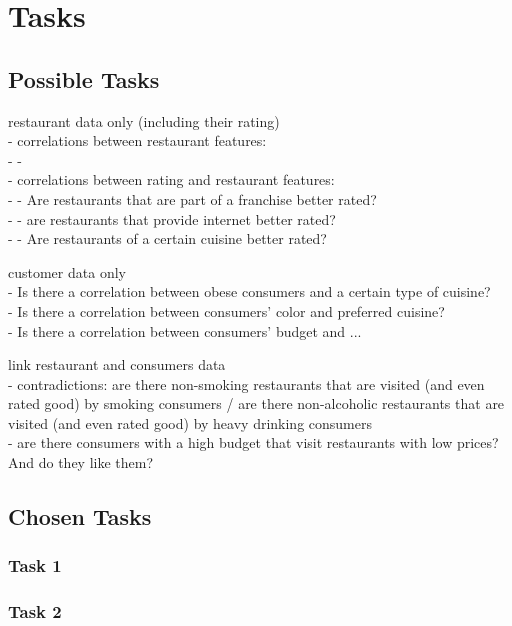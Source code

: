 \section{Tasks}\label{sec:tasks}


\subsection{Possible Tasks}

restaurant data only (including their rating)
\\- correlations between restaurant features:
\\- - 
\\- correlations between rating and restaurant features:
\\- - Are restaurants that are part of a franchise better rated?
\\- - are restaurants that provide internet better rated?
\\- - Are restaurants of a certain cuisine better rated?


customer data only
\\- Is there a correlation between obese consumers and a certain type of cuisine?
\\- Is there a correlation between consumers' color and preferred cuisine?
\\- Is there a correlation between consumers' budget and ...


link restaurant and consumers data
\\- contradictions: are there non-smoking restaurants that are visited (and even rated good) by smoking consumers / are there non-alcoholic restaurants that are visited (and even rated good) by heavy drinking consumers
\\- are there consumers with a high budget that visit restaurants with low prices? And do they like them?
\\


\subsection{Chosen Tasks}



\subsubsection{Task 1}\label{sec:task1}


\subsubsection{Task 2}\label{sec:task2}

